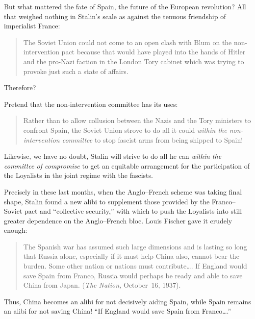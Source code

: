 But what mattered the fate of Spain, the future of the European revolution? All that weighed nothing in Stalin’s scale as against the tenuous friendship of imperialist France:

\begin{quotation}
  The Soviet Union could not come to an open clash with Blum on the non-intervention pact because that would have played into the hands of Hitler and the pro-Nazi faction in the London Tory cabinet which was trying to provoke just such a state of affairs.\endnotemark[\ref{en:GannesUSSR}]  
\end{quotation}

\noindent
Therefore?

\smallskip

\noindent
Pretend that the non-intervention committee has its uses:

\begin{quotation}
  Rather than to allow collusion between the Nazis and the Tory ministers to confront Spain, the Soviet Union strove to do all it could \emph{within the non-intervention committee} to stop fascist arms from being shipped to Spain!{\kern 0.5pt}\endnotemark[\ref{en:GannesUSSR}]  
\end{quotation}

Likewise, we have no doubt, Stalin will strive to do all he can \emph{within the committee of compromise} to get an equitable arrangement for the participation of the Loyalists in the joint regime with the fascists.

\begin{sloppypar}
Precisely in these last months, when the Anglo--French scheme was taking final shape\kn, Stalin found a new alibi to supplement those provided by the Franco--Soviet pact and ``collective security,\kn\kn'' with which to push the Loyalists into still greater dependence on the Anglo--French bloc. Louis Fischer gave it crudely enough:
\end{sloppypar}

\begin{quotation}
  The Spanish war has assumed such large dimensions and is lasting so long that Russia alone, especially if it must help China also, cannot bear the burden. Some other nation or nations must contribute\dots. If England would save Spain from Franco, Russia would perhaps be ready and able to save China from Japan. (\emph{The Nation,} October~16, 1937).
\end{quotation}

Thus, China becomes an alibi for not decisively aiding Spain, while Spain remains an alibi for not saving China! ``If England would save Spain from Franco\dots.''

